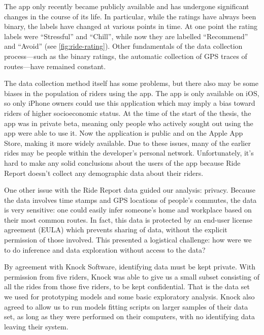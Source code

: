 \documentclass[12pt,twoside]{reedthesis}
\begin{document}
  The app only recently became publicly available and has undergone
  significant changes in the course of its life. In particular, while the
  ratings have always been binary, the labels have changed at various
  points in time. At one point the rating labels were ``Stressful'' and
  ``Chill'', while now they are labelled ``Recommend'' and ``Avoid'' (see
  \autoref{fig:ride-rating}). Other fundamentals of the data collection
  process---such as the binary ratings, the automatic collection of GPS
  traces of routes---have remained constant.
  
  The data collection method itself has some problems, but there also may
  be some biases in the population of riders using the app. The app is
  only available on iOS, so only iPhone owners could use this application
  which may imply a bias toward riders of higher socioeconomic status. At
  the time of the start of the thesis, the app was in private beta,
  meaning only people who actively sought out using the app were able to
  use it. Now the application is public and on the Apple App Store, making
  it more widely available. Due to these issues, many of the earlier rides
  may be people within the developer's personal network. Unfortunately,
  it's hard to make any solid conclusions about the users of the app
  because Ride Report doesn't collect any demographic data about their
  riders.
  
  One other issue with the Ride Report data guided our analysis: privacy.
  Because the data involves time stamps and GPS locations of people's
  commutes, the data is very sensitive: one could easily infer someone's
  home and workplace based on their most common routes. In fact, this data
  is protected by an end-user license agreement (EULA) which prevents
  sharing of data, without the explicit permission of those involved. This
  presented a logistical challenge: how were we to do inference and data
  exploration without access to the data?
  
  By agreement with Knock Software, identifying data must be kept private.
  With permission from five riders, Knock was able to give us a small
  subset consisting of all the rides from those five riders, to be kept
  confidential. That is the data set we used for prototyping models and
  some basic exploratory analysis. Knock also agreed to allow us to run
  models fitting scripts on larger samples of their data set, as long as
  they were performed on their computers, with no identifying data leaving
  their system.
  
\end{document}

